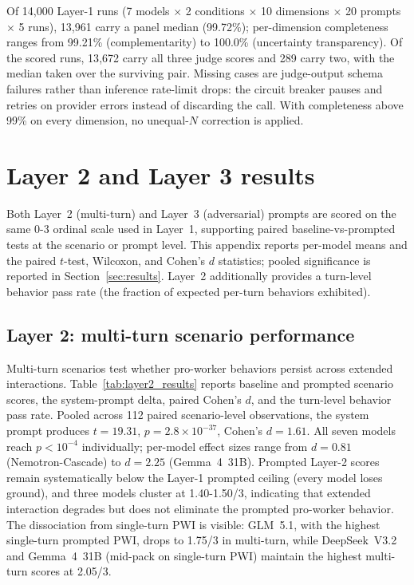 \documentclass{article}
\begin{document}
Of 14{,}000 Layer-1 runs (7 models $\times$ 2 conditions $\times$ 10 dimensions $\times$ 20 prompts $\times$ 5 runs), 13{,}961 carry a panel median (99.72\%); per-dimension completeness ranges from 99.21\% (complementarity) to 100.0\% (uncertainty transparency). Of the scored runs, 13{,}672 carry all three judge scores and 289 carry two, with the median taken over the surviving pair. Missing cases are judge-output schema failures rather than inference rate-limit drops: the circuit breaker pauses and retries on provider errors instead of discarding the call. With completeness above 99\% on every dimension, no unequal-$N$ correction is applied.


\section{Layer 2 and Layer 3 results}
\label{app:layers}

Both Layer~2 (multi-turn) and Layer~3 (adversarial) prompts are scored on the same 0-3 ordinal scale used in Layer~1, supporting paired baseline-vs-prompted tests at the scenario or prompt level. This appendix reports per-model means and the paired $t$-test, Wilcoxon, and Cohen's $d$ statistics; pooled significance is reported in Section~\ref{sec:results}. Layer~2 additionally provides a turn-level behavior pass rate (the fraction of expected per-turn behaviors exhibited).

\subsection{Layer 2: multi-turn scenario performance}

Multi-turn scenarios test whether pro-worker behaviors persist across extended interactions. Table~\ref{tab:layer2_results} reports baseline and prompted scenario scores, the system-prompt delta, paired Cohen's $d$, and the turn-level behavior pass rate. Pooled across 112 paired scenario-level observations, the system prompt produces $t = 19.31$, $p = 2.8 \times 10^{-37}$, Cohen's $d = 1.61$. All seven models reach $p < 10^{-4}$ individually; per-model effect sizes range from $d = 0.81$ (Nemotron-Cascade) to $d = 2.25$ (Gemma~4~31B). Prompted Layer-2 scores remain systematically below the Layer-1 prompted ceiling (every model loses ground), and three models cluster at 1.40-1.50/3, indicating that extended interaction degrades but does not eliminate the prompted pro-worker behavior. The dissociation from single-turn PWI is visible: GLM~5.1, with the highest single-turn prompted PWI, drops to 1.75/3 in multi-turn, while DeepSeek~V3.2 and Gemma~4~31B (mid-pack on single-turn PWI) maintain the highest multi-turn scores at 2.05/3.
\end{document}
